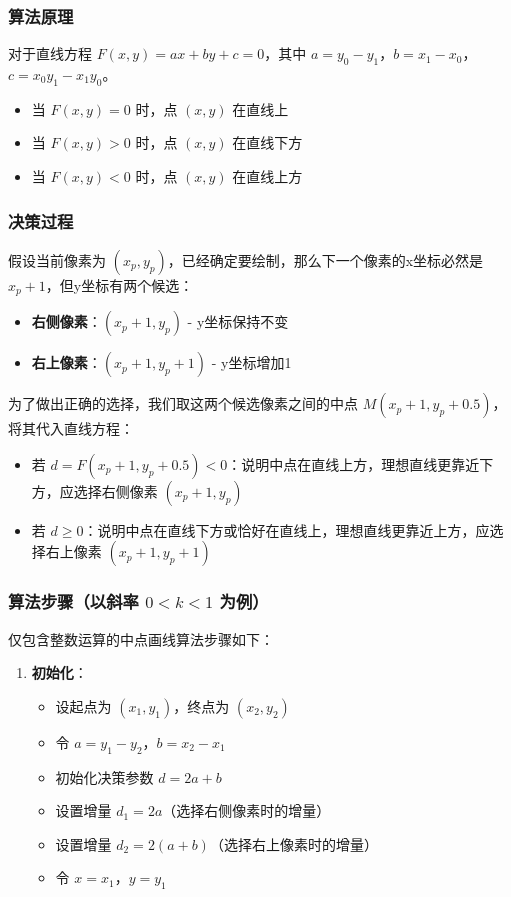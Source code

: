 \documentclass[12pt,a4paper]{article}
\begin{document}
\begin{tcolorbox}

\subsubsection*{算法原理}

对于直线方程 $F(x,y) = ax + by + c = 0$，其中 $a = y_0 - y_1$，$b = x_1 - x_0$，$c = x_0y_1 - x_1y_0$。

\begin{itemize}
    \item 当 $F(x,y) = 0$ 时，点 $(x,y)$ 在直线上
    \item 当 $F(x,y) > 0$ 时，点 $(x,y)$ 在直线下方
    \item 当 $F(x,y) < 0$ 时，点 $(x,y)$ 在直线上方
\end{itemize}

\subsubsection*{决策过程}

假设当前像素为 $(x_p, y_p)$，已经确定要绘制，那么下一个像素的x坐标必然是 $x_p+1$，但y坐标有两个候选：
\begin{itemize}
    \item \textbf{右侧像素}：$(x_p+1, y_p)$ - y坐标保持不变
    \item \textbf{右上像素}：$(x_p+1, y_p+1)$ - y坐标增加1
\end{itemize}

为了做出正确的选择，我们取这两个候选像素之间的中点 $M(x_p+1, y_p+0.5)$，将其代入直线方程：
\begin{itemize}
    \item 若 $d = F(x_p+1, y_p+0.5) < 0$：说明中点在直线上方，理想直线更靠近下方，应选择右侧像素 $(x_p+1, y_p)$
    \item 若 $d \geq 0$：说明中点在直线下方或恰好在直线上，理想直线更靠近上方，应选择右上像素 $(x_p+1, y_p+1)$
\end{itemize}

\subsubsection*{算法步骤（以斜率 $0 < k < 1$ 为例）}

仅包含整数运算的中点画线算法步骤如下：

\begin{enumerate}
    \item \textbf{初始化}：
    \begin{itemize}
        \item 设起点为 $(x_1, y_1)$，终点为 $(x_2, y_2)$
        \item 令 $a = y_1 - y_2$，$b = x_2 - x_1$
        \item 初始化决策参数 $d = 2a + b$
        \item 设置增量 $d_1 = 2a$（选择右侧像素时的增量）
        \item 设置增量 $d_2 = 2(a + b)$（选择右上像素时的增量）
        \item 令 $x = x_1$，$y = y_1$
    \end{itemize}
    

\end{enumerate}
\end{tcolorbox}
\end{document}
